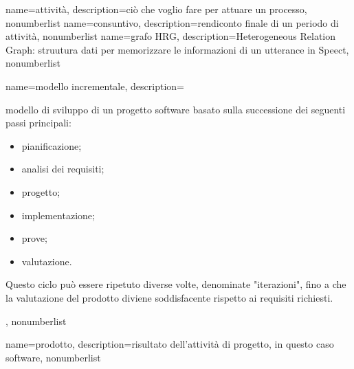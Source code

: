 {
name={attività},
description={ciò che voglio fare per attuare un processo},
nonumberlist
}
{
name={consuntivo},
description={rendiconto finale di un periodo di attività},
nonumberlist
}
{
name={grafo HRG},
description={Heterogeneous Relation Graph: struutura dati per memorizzare le informazioni di un utterance in Speect},
nonumberlist
}
{
name={modello incrementale},
description={modello di sviluppo di un progetto software basato sulla successione dei seguenti passi principali:
\begin{itemize}
    \item pianificazione;
    \item analisi dei requisiti;
    \item progetto;
    \item implementazione;
    \item prove;
    \item valutazione.
\end{itemize}
Questo ciclo può essere ripetuto diverse volte, denominate "iterazioni", fino a che la valutazione del prodotto diviene soddisfacente rispetto ai requisiti richiesti.},
nonumberlist
}
{
name={prodotto},
description={risultato dell'attività di progetto, in questo caso software},
nonumberlist
}
